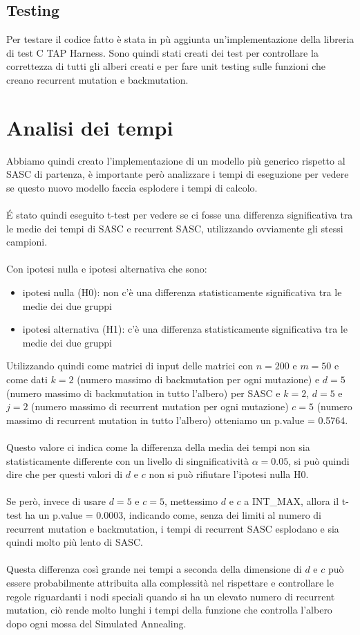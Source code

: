 \documentclass[12pt]{report}
\begin{document}
  \section{Testing}

  Per testare il codice fatto è stata in pù aggiunta un'implementazione della libreria di test C TAP Harness\cite{C-TAP}. Sono quindi stati creati dei test per controllare la correttezza di tutti gli alberi creati e per fare unit testing sulle funzioni che creano recurrent mutation e backmutation.

\chapter{Analisi dei tempi}

  Abbiamo quindi creato l'implementazione di un modello più generico rispetto al SASC di partenza, è importante però analizzare i tempi di eseguzione per vedere se questo nuovo modello faccia esplodere i tempi di calcolo.\\\\
  \'E stato quindi eseguito t-test per vedere se ci fosse una differenza significativa tra le medie dei tempi di SASC e recurrent SASC, utilizzando ovviamente gli stessi campioni.\\\\
  Con ipotesi nulla e ipotesi alternativa che sono:
  \begin{itemize}
    \item ipotesi nulla (H0): non c'è una differenza statisticamente significativa tra le medie dei due gruppi
    \item ipotesi alternativa (H1): c'è una differenza statisticamente significativa tra le medie dei due gruppi
  \end{itemize}
  Utilizzando quindi come matrici di input delle matrici con $n=200$ e $m=50$ e come dati $k=2$ (numero massimo di backmutation per ogni mutazione) e $d=5$ (numero massimo di backmutation in tutto l'albero) per SASC e $k=2$, $d=5$ e $j=2$ (numero massimo di recurrent mutation per ogni mutazione) $c=5$ (numero massimo di recurrent mutation in tutto l'albero) otteniamo un p.value = 0.5764.\\\\
  Questo valore ci indica come la differenza della media dei tempi non sia statisticamente differente con un livello di singnificatività $\alpha=0.05$, si può quindi dire che per questi valori di $d$ e $c$ non si può rifiutare l'ipotesi nulla H0.\\\\
  Se però, invece di usare $d=5$ e $c=5$, mettessimo $d$ e $c$ a INT\_MAX, allora il t-test ha un p.value = 0.0003, indicando come, senza dei limiti al numero di recurrent mutation e backmutation, i tempi di recurrent SASC esplodano e sia quindi molto più lento di SASC.\\\\
  Questa differenza così grande nei tempi a seconda della dimensione di $d$ e $c$ può essere probabilmente attribuita alla complessità nel rispettare e controllare le regole riguardanti i nodi speciali quando si ha un elevato numero di recurrent mutation, ciò rende molto lunghi i tempi della funzione che controlla l'albero dopo ogni mossa del Simulated Annealing.
\end{document}

